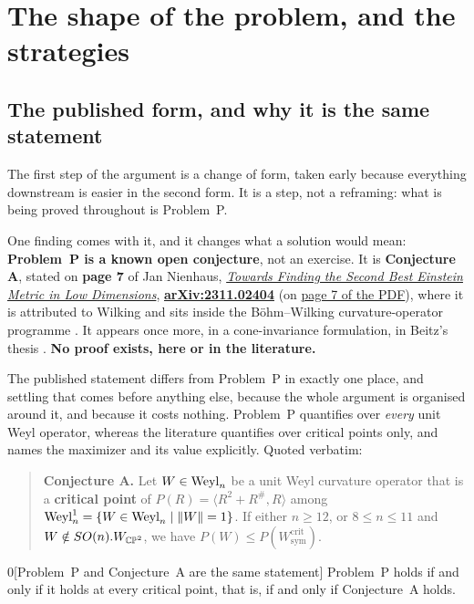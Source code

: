 \section{The shape of the problem, and the strategies}\label{sec:shape}

\subsection{The published form, and why it is the same statement}\label{sec:twoforms}

The first step of the argument is a change of form, taken early because everything downstream is easier in the second form. It is a step, not a reframing: what is being proved throughout is Problem~P.

One finding comes with it, and it changes what a solution would mean: \textbf{Problem~P is a known open conjecture}, not an exercise. It is \textbf{Conjecture A}, stated on \textbf{page 7} of Jan Nienhaus, \href{https://arxiv.org/abs/2311.02404}{\emph{Towards Finding the Second Best Einstein Metric in Low Dimensions}}, \href{https://arxiv.org/abs/2311.02404}{\textbf{arXiv:2311.02404}} \cite{nienhaus2023} (on \href{https://arxiv.org/pdf/2311.02404\#page=7}{page 7 of the PDF}), where it is attributed to Wilking and sits inside the B\"ohm--Wilking curvature-operator programme \cite{bw2008}. It appears once more, in a cone-invariance formulation, in Beitz's thesis \cite{beitz2018}. \textbf{No proof exists, here or in the literature.}

The published statement differs from Problem~P in exactly one place, and settling that comes before anything else, because the whole argument is organised around it, and because it costs nothing. Problem~P quantifies over \emph{every} unit Weyl operator, whereas the literature quantifies over critical points only, and names the maximizer and its value explicitly. Quoted verbatim:

\begin{quote}
\small
\textbf{Conjecture A.} Let $W\in\mathrm{Weyl}_n$ be a unit Weyl curvature operator that is a \textbf{critical point} of $P(R)=\langle R^2+R^{\#},R\rangle$ among $\mathrm{Weyl}^1_n=\{W\in\mathrm{Weyl}_n\mid\|W\|=1\}$. If either $n\ge12$, or $8\le n\le11$ and $W\notin SO(n).W_{\mathbb{CP}^2}$, we have $P(W)\le P(W^{\mathrm{crit}}_{\mathrm{sym}})$.
\end{quote}

\begin{Lem}{0}[Problem~P and Conjecture~A are the same statement]
Problem~P holds if and only if it holds at every critical point, that is, if and only if Conjecture~A holds.
\end{Lem}

